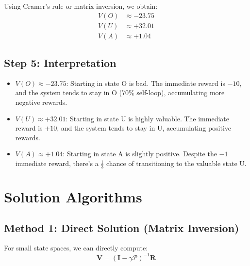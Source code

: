 \documentclass[11pt]{article}
\theoremstyle{definition}
\begin{document}
Using Cramer's rule or matrix inversion, we obtain:
\[
\boxed{
\begin{aligned}
V(O) &\approx -23.75 \\
V(U) &\approx +32.01 \\
V(A) &\approx +1.04
\end{aligned}
}
\]

\subsection{Step 5: Interpretation}

\begin{itemize}
    \item \textbf{$V(O) \approx -23.75$}: Starting in state O is bad. The immediate reward is $-10$, and the system tends to stay in O (70\% self-loop), accumulating more negative rewards.

    \item \textbf{$V(U) \approx +32.01$}: Starting in state U is highly valuable. The immediate reward is $+10$, and the system tends to stay in U, accumulating positive rewards.

    \item \textbf{$V(A) \approx +1.04$}: Starting in state A is slightly positive. Despite the $-1$ immediate reward, there's a $\frac{1}{3}$ chance of transitioning to the valuable state U.
\end{itemize}

\section{Solution Algorithms}

\subsection{Method 1: Direct Solution (Matrix Inversion)}

For small state spaces, we can directly compute:
\[
\mathbf{V} = (\mathbf{I} - \gamma \mathcal{P})^{-1} \mathbf{R}
\]

\begin{center}
\end{center}
\end{document}
